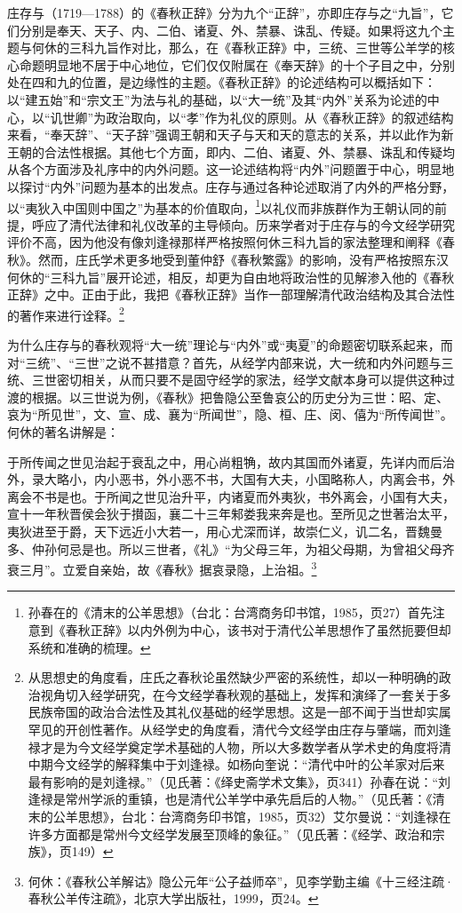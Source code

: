 \documentclass[a4paper, 12pt, openright]{ctexbook}
\renewenvironment{quote}
  {\list{}{\rightmargin2\ccwd \leftmargin2\ccwd \itemindent=2\ccwd \listparindent=2\ccwd}%
   \item\relax\small\kaishu\color{black}}
  {\endlist}
\begin{document}
庄存与（1719—1788）的《春秋正辞》分为九个“正辞”，亦即庄存与之“九旨”，它们分别是奉天、天子、内、二伯、诸夏、外、禁暴、诛乱、传疑。如果将这九个主题与何休的三科九旨作对比，那么，在《春秋正辞》中，三统、三世等公羊学的核心命题明显地不居于中心地位，它们仅仅附属在《奉天辞》的十个子目之中，分别处在四和九的位置，是边缘性的主题。《春秋正辞》的论述结构可以概括如下：以“建五始”和“宗文王”为法与礼的基础，以“大一统”及其“内外”关系为论述的中心，以“讥世卿”为政治取向，以“孝”作为礼仪的原则。从《春秋正辞》的叙述结构来看，“奉天辞”、“天子辞”强调王朝和天子与天和天的意志的关系，并以此作为新王朝的合法性根据。其他七个方面，即内、二伯、诸夏、外、禁暴、诛乱和传疑均从各个方面涉及礼序中的内外问题。这一论述结构将“内外”问题置于中心，明显地以探讨“内外”问题为基本的出发点。庄存与通过各种论述取消了内外的严格分野，以“夷狄入中国则中国之”为基本的价值取向，\footnote{孙春在的《清末的公羊思想》（台北：台湾商务印书馆，1985，页27）首先注意到《春秋正辞》以内外例为中心，该书对于清代公羊思想作了虽然扼要但却系统和准确的梳理。}以礼仪而非族群作为王朝认同的前提，呼应了清代法律和礼仪改革的主导倾向。历来学者对于庄存与的今文经学研究评价不高，因为他没有像刘逢禄那样严格按照何休三科九旨的家法整理和阐释《春秋》。然而，庄氏学术更多地受到董仲舒《春秋繁露》的影响，没有严格按照东汉何休的“三科九旨”展开论述，相反，却更为自由地将政治性的见解渗入他的《春秋正辞》之中。正由于此，我把《春秋正辞》当作一部理解清代政治结构及其合法性的著作来进行诠释。\footnote{从思想史的角度看，庄氏之春秋论虽然缺少严密的系统性，却以一种明确的政治视角切入经学研究，在今文经学春秋观的基础上，发挥和演绎了一套关于多民族帝国的政治合法性及其礼仪基础的经学思想。这是一部不闻于当世却实属罕见的开创性著作。从经学史的角度看，清代今文经学由庄存与肇端，而刘逢禄才是为今文经学奠定学术基础的人物，所以大多数学者从学术史的角度将清中期今文经学的解释集中于刘逢禄。如杨向奎说：“清代中叶的公羊家对后来最有影响的是刘逢禄。”（见氏著：《绎史斋学术文集》，页341）孙春在说：“刘逢禄是常州学派的重镇，也是清代公羊学中承先启后的人物。”（见氏著：《清末的公羊思想》，台北：台湾商务印书馆，1985，页32）艾尔曼说：“刘逢禄在许多方面都是常州今文经学发展至顶峰的象征。”（见氏著：《经学、政治和宗族》，页149）}

为什么庄存与的春秋观将“大一统”理论与“内外”或“夷夏”的命题密切联系起来，而对“三统”、“三世”之说不甚措意？首先，从经学内部来说，大一统和内外问题与三统、三世密切相关，从而只要不是固守经学的家法，经学文献本身可以提供这种过渡的根据。以三世说为例，《春秋》把鲁隐公至鲁哀公的历史分为三世：昭、定、哀为“所见世”，文、宣、成、襄为“所闻世”，隐、桓、庄、闵、僖为“所传闻世”。何休的著名讲解是：

\begin{quote}
于所传闻之世见治起于衰乱之中，用心尚粗觕，故内其国而外诸夏，先详内而后治外，录大略小，内小恶书，外小恶不书，大国有大夫，小国略称人，内离会书，外离会不书是也。于所闻之世见治升平，内诸夏而外夷狄，书外离会，小国有大夫，宣十一年秋晋侯会狄于攅函，襄二十三年邾娄我来奔是也。至所见之世著治太平，夷狄进至于爵，天下远近小大若一，用心尤深而详，故崇仁义，讥二名，晋魏曼多、仲孙何忌是也。所以三世者，《礼》“为父母三年，为祖父母期，为曾祖父母齐衰三月”。立爱自亲始，故《春秋》据哀录隐，上治祖。\footnote{何休：《春秋公羊解诂》隐公元年“公子益师卒”，见李学勤主编《十三经注疏·春秋公羊传注疏》，北京大学出版社，1999，页24。}
\end{quote}
\end{document}
